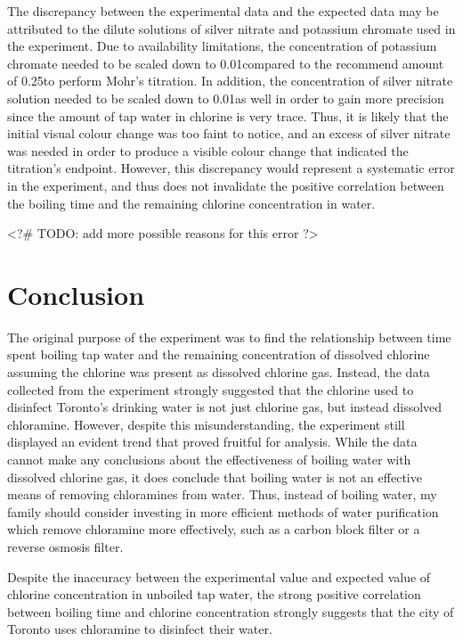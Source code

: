 \documentclass[11pt]{article}
\begin{document}
The discrepancy between the experimental data and the expected data may be attributed to the dilute solutions of silver nitrate and potassium chromate used in the experiment. Due to availability limitations, the concentration of potassium chromate needed to be scaled down to 0.01\mpl compared to the recommend amount of 0.25\mpl to perform Mohr's titration. In addition, the concentration of silver nitrate solution needed to be scaled down to 0.01\mpl as well in order to gain more precision since the amount of tap water in chlorine is very trace. Thus, it is likely that the initial visual colour change was too faint to notice, and an excess of silver nitrate was needed in order to produce a visible colour change that indicated the titration's endpoint. However, this discrepancy would represent a systematic error in the experiment, and thus does not invalidate the positive correlation between the boiling time and the remaining chlorine concentration in water. %

<?# TODO: add more possible reasons for this error ?>

\section{Conclusion}

The original purpose of the experiment was to find the relationship between time spent boiling tap water and the remaining concentration of dissolved chlorine assuming the chlorine was present as dissolved chlorine gas. Instead, the data collected from the experiment strongly suggested that the chlorine used to disinfect Toronto's drinking water is not just chlorine gas, but instead dissolved chloramine. However, despite this misunderstanding, the experiment still displayed an evident trend that proved fruitful for analysis. While the data cannot make any conclusions about the effectiveness of boiling water with dissolved chlorine gas, it does conclude that boiling water is not an effective means of removing chloramines from water. Thus, instead of boiling water, my family should consider investing in more efficient methods of water purification which remove chloramine more effectively, such as a carbon block filter or a reverse osmosis filter.

Despite the inaccuracy between the experimental value and expected value of chlorine concentration in unboiled tap water, the strong positive correlation between boiling time and chlorine concentration strongly suggests that the city of Toronto uses chloramine to disinfect their water.
\end{document}
